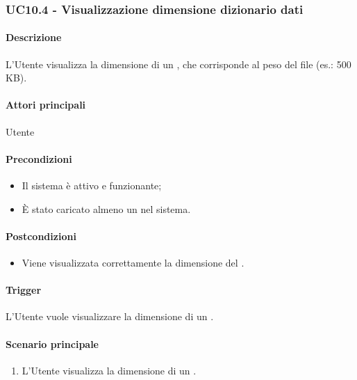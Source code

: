 
\subsubsection{UC10.4 - Visualizzazione dimensione dizionario dati}\label{UC10point4}
\paragraph*{Descrizione}
L'Utente visualizza la dimensione di un , che corrisponde al peso del file (es.: 500 KB).

\paragraph*{Attori principali}
Utente

\paragraph*{Precondizioni}
\begin{itemize}
  \item Il sistema è attivo e funzionante;
  \item È stato caricato almeno un  nel sistema. 
\end{itemize}

\paragraph*{Postcondizioni}
\begin{itemize}
  \item Viene visualizzata correttamente la dimensione del .
\end{itemize}

\paragraph*{Trigger}
L'Utente vuole visualizzare la dimensione di un .

\paragraph*{Scenario principale}
\begin{enumerate}
  \item L'Utente visualizza la dimensione di un .
\end{enumerate}

